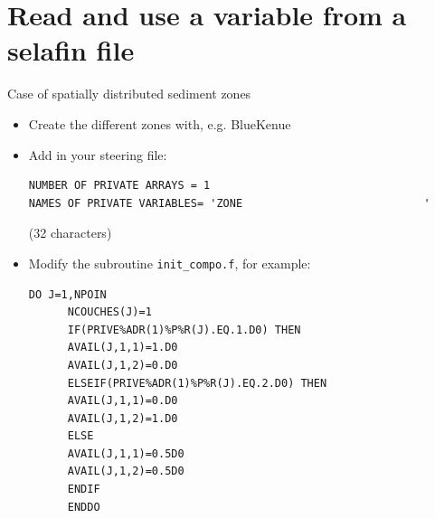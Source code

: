 {%
\section{Read and use a variable from a selafin file}
Case of spatially distributed sediment zones

\begin{itemize}
\item Create the different zones with, e.g. BlueKenue
\item Add in your steering file:
  \begin{lstlisting}[frame=trBL]
NUMBER OF PRIVATE ARRAYS = 1
NAMES OF PRIVATE VARIABLES= 'ZONE                            '
\end{lstlisting}
(32 characters)%
\item Modify the subroutine \texttt{init\_compo.f}, for example:
\begin{lstlisting}[frame=trBL]
      DO J=1,NPOIN
      NCOUCHES(J)=1
	  IF(PRIVE%ADR(1)%P%R(J).EQ.1.D0) THEN
	  AVAIL(J,1,1)=1.D0
	  AVAIL(J,1,2)=0.D0
	  ELSEIF(PRIVE%ADR(1)%P%R(J).EQ.2.D0) THEN
	  AVAIL(J,1,1)=0.D0
	  AVAIL(J,1,2)=1.D0
	  ELSE
	  AVAIL(J,1,1)=0.5D0
	  AVAIL(J,1,2)=0.5D0
	  ENDIF
      ENDDO
\end{lstlisting}
\end{itemize}




}
